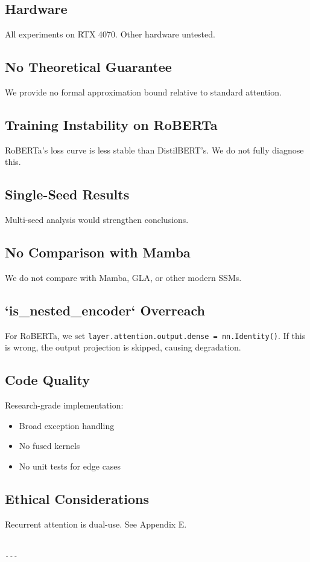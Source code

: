 \subsection{Hardware}

All experiments on RTX 4070. Other hardware untested.

\subsection{No Theoretical Guarantee}

We provide no formal approximation bound relative to standard attention.

\subsection{Training Instability on RoBERTa}

RoBERTa's loss curve is less stable than DistilBERT's. We do not fully 
diagnose this.

\subsection{Single-Seed Results}

Multi-seed analysis would strengthen conclusions.

\subsection{No Comparison with Mamba}

We do not compare with Mamba, GLA, or other modern SSMs.

\subsection{`is\_nested\_encoder` Overreach}

For RoBERTa, we set \texttt{layer.attention.output.dense = nn.Identity()}. If 
this is wrong, the output projection is skipped, causing degradation.

\subsection{Code Quality}

Research-grade implementation:
\begin{itemize}
\item Broad exception handling
\item No fused kernels
\item No unit tests for edge cases

\end{itemize}
\subsection{Ethical Considerations}

Recurrent attention is dual-use. See Appendix E.
\begin{lstlisting}

---
\end{lstlisting}